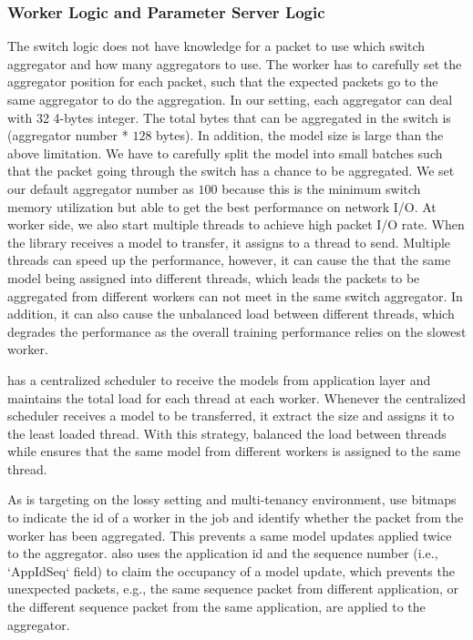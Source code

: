 \subsubsection{Worker Logic and Parameter Server Logic}
The switch logic does not have knowledge for a packet to use which switch aggregator and how many aggregators to use.
The worker has to carefully set the aggregator position for each packet, such that
the expected packets go to the same aggregator to do the aggregation. 
In our setting, each aggregator can deal with 32 4-bytes integer. 
The total bytes that can be aggregated in the switch is (aggregator number * $128$ bytes).
In addition, the model size is large than the above limitation. 
We have to carefully split the model into small batches such that
the packet going through the switch has a chance to be aggregated. 
We set our default aggregator number as $100$ because this is the minimum switch
memory utilization but able to get the best performance on network I/O.
At worker side, we also start multiple threads to achieve high packet I/O rate.
When the \system library receives a model to transfer, it assigns to a thread to send.
Multiple threads can speed up the performance, however, it can cause the 
that the same model being assigned into different threads, which leads 
the packets to be aggregated from different workers can not meet in the same switch aggregator. 
In addition, it can also cause the unbalanced load between different threads, which degrades
the performance as the overall training performance relies on the slowest worker. 

\system has a centralized scheduler to receive the models from application layer 
and maintains the total load for each thread at each worker. 
Whenever the centralized scheduler receives a model to be transferred, it extract the size and 
assigns it to the least loaded thread. With this strategy, \system balanced the load
between threads while ensures that the same model from different workers is assigned to the same thread.


As \system is targeting on the lossy setting and multi-tenancy environment, 
\system use bitmaps to indicate the id of a worker in the job 
and identify whether the packet from the worker has been aggregated. 
This prevents a same model updates applied twice to the aggregator.
\system also uses the application id and the sequence number (i.e., `AppIdSeq` field) 
to claim the occupancy of a model update, which prevents the unexpected packets, 
e.g., the same sequence packet from different application, 
or the different sequence packet from the same application, are applied 
to the aggregator. 

